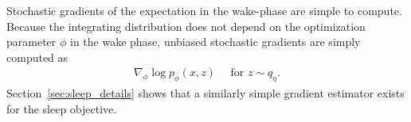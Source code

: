 Stochastic gradients of the expectation in the wake-phase are simple to compute. Because the integrating distribution does not depend on the optimization parameter $\phi$ in the wake phase, unbiased stochastic gradients are simply computed as 
\begin{align}
    \nabla_\phi \log p_\phi(x, z) \quad \text{ for } z\sim q_\eta. 
    \label{eq:mstep_grad}
\end{align}
Section~\ref{sec:sleep_details} shows that a similarly simple gradient estimator exists for the sleep objective.


